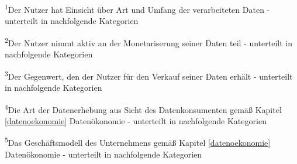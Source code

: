 \noindent \textsuperscript{1}Der Nutzer hat Einsicht über Art und Umfang der verarbeiteten Daten - unterteilt in nachfolgende Kategorien \newline

\noindent \textsuperscript{2}Der Nutzer nimmt aktiv an der Monetariserung seiner Daten teil - unterteilt in nachfolgende Kategorien \newline

\noindent \textsuperscript{3}Der Gegenwert, den der Nutzer für den Verkauf seiner Daten erhält - unterteilt in nachfolgende Kategorien\newline

\noindent \textsuperscript{4}Die Art der Datenerhebung aus Sicht des Datenkonsumenten gemäß Kapitel \ref{datenoekonomie} Datenökonomie - unterteilt in nachfolgende Kategorien\newline

\noindent \textsuperscript{5}Das Geschäftsmodell des Unternehmens gemäß Kapitel \ref{datenoekonomie} Datenökonomie - unterteilt in nachfolgende Kategorien\newline